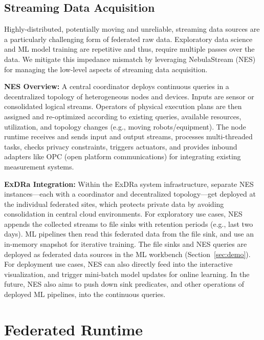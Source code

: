 \documentclass[sigconf,screen]{acmart}
\begin{document}
\subsection{Streaming Data Acquisition}

Highly-distributed, potentially moving and unreliable, streaming data sources are a particularly challenging form of federated raw data. Exploratory data science and ML model training are repetitive and thus, require multiple passes over the data. We mitigate this impedance mismatch by leveraging NebulaStream (NES) for managing the low-level aspects of streaming data acquisition.

\textbf{NES Overview:} A central coordinator deploys continuous queries in a decentralized topology of heterogeneous nodes and devices. Inputs are sensor or consolidated logical streams. Operators of physical execution plans are then assigned and re-optimized \cite{GrulichBZTBCRM20} according to existing queries, available resources, utilization, and topology changes (e.g., moving robots/equipment). The node runtime receives and sends input and output streams, processes multi-threaded tasks, checks privacy constraints, triggers actuators, and provides inbound adapters like OPC (open platform communications) for integrating existing measurement systems.

\textbf{ExDRa Integration:} Within the ExDRa system infrastructure, separate NES instances---each with a coordinator and decentralized topology---get deployed at the individual federated sites, which protects private data by avoiding consolidation in central cloud environments. For exploratory use cases, NES appends the collected streams to file sinks with retention periods (e.g., last two days). ML pipelines then read this federated data from the file sink, and use an in-memory snapshot for iterative training. The file sinks and NES queries are deployed as federated data sources in the ML workbench (Section~\ref{sec:demo}). For deployment use cases, NES can also directly feed into the interactive visualization, and trigger mini-batch model updates for online learning. In the future, NES also aims to push down sink predicates, and other operations of deployed ML pipelines, into the continuous queries.

\section{Federated Runtime}
\label{sec:federated}
\end{document}
